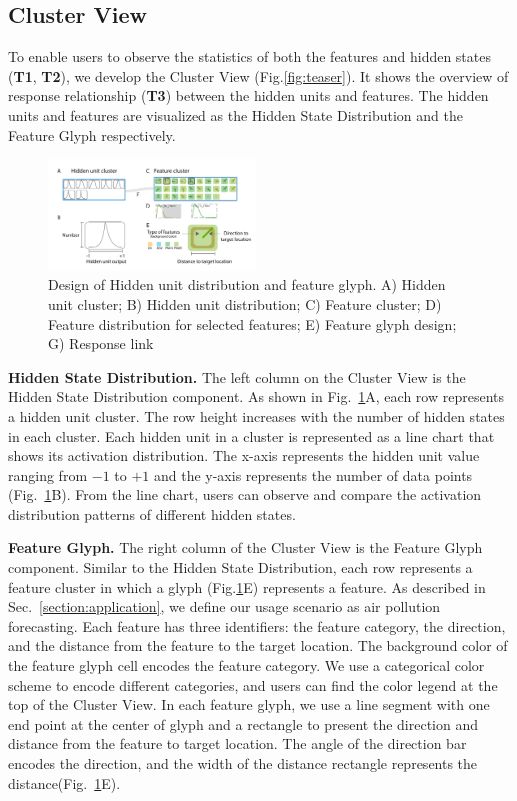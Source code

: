\subsection{Cluster View}
To enable users to observe the statistics of both the features and hidden states (\textbf{T1},\textbf{ T2}), we develop the Cluster View (Fig.\ref{fig:teaser}).
It shows the overview of response relationship (\textbf{T3}) between the hidden units and features. The hidden units and features are visualized as the Hidden State Distribution and the Feature Glyph respectively.


\begin{figure}[t]
	\centering
    \includegraphics[width=0.49\textwidth]{pictures/design/cluster_design.pdf}
	\vspace{-3mm}
	\caption{Design of Hidden unit distribution and feature glyph. A) Hidden unit cluster; B) Hidden unit distribution; C) Feature cluster; D) Feature distribution for selected features; E) Feature glyph design; G) Response link}
	\label{fig:cluster_design}
	\vspace{-4mm}
\end{figure}


\textbf{Hidden State Distribution.}
The left column on the Cluster View is the Hidden State Distribution component.
As shown in Fig.~\ref{fig:cluster_design}A, each row represents a hidden unit cluster.
The row height increases with the number of hidden states in each cluster.
Each hidden unit in a cluster is represented as a line chart that shows its activation distribution.
The x-axis represents the hidden unit value ranging from $-1$ to $+1$ and the y-axis represents the number of data points (Fig.~\ref{fig:cluster_design}B).
From the line chart, users can observe and compare the activation distribution patterns of different hidden states.

\textbf{Feature Glyph.}
The right column of the Cluster View is the Feature Glyph component.
Similar to the Hidden State Distribution, each row represents a feature cluster in which a glyph (Fig.\ref{fig:cluster_design}E) represents a feature.
As described in Sec.~\ref{section:application}, we define our usage scenario as air pollution forecasting.
Each feature has three identifiers: the feature category, the direction, and the distance from the feature to the target location.
The background color of the feature glyph cell encodes the feature category.
We use a categorical color scheme to encode different categories, and users can find the color legend at the top of the Cluster View.
In each feature glyph, we use a line segment with one end point at the center of glyph and a rectangle to present the direction and distance from the feature to target location.
The angle of the direction bar encodes the direction, and the width of the distance rectangle represents the distance(Fig.~\ref{fig:cluster_design}E).

